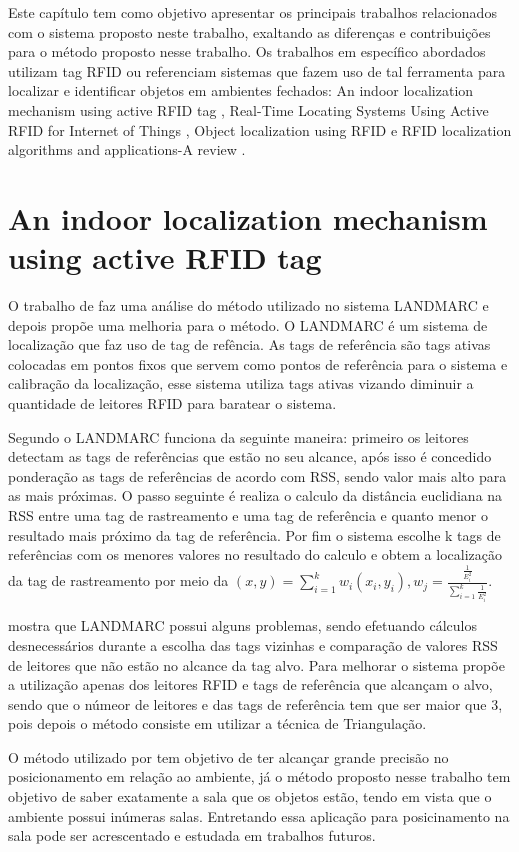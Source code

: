 \label{chapter:correlatos}
Este capítulo tem como objetivo apresentar os principais trabalhos relacionados com o sistema proposto neste trabalho, exaltando as diferenças e contribuições para o método proposto nesse trabalho. Os trabalhos em específico abordados utilizam tag RFID ou referenciam sistemas que fazem uso de tal ferramenta para localizar e identificar objetos em ambientes fechados: An indoor localization mechanism using active RFID tag \cite{mechanismRFID2006}, Real-Time Locating Systems Using Active RFID for Internet of Things \cite{realtimeRFID2016}, Object localization using RFID \cite{localization2010} e RFID localization algorithms and applications-A review \cite{rfid2009review}.

\section{An indoor localization mechanism using active RFID tag}
O trabalho de \citeauthor{mechanismRFID2006} faz uma análise do método utilizado no sistema LANDMARC e depois propõe uma melhoria para o método. O LANDMARC é um sistema de localização que faz uso de tag de refência. As tags de referência são tags ativas colocadas em pontos fixos que servem como pontos de referência para o sistema e calibração da localização, esse sistema utiliza tags ativas vizando diminuir a quantidade de leitores RFID para baratear o sistema.

\par
Segundo \citeauthor{mechanismRFID2006} o LANDMARC funciona da seguinte maneira: primeiro os leitores detectam as tags de referências que estão no seu alcance, após isso é concedido ponderação as tags de referências de acordo com RSS, sendo valor mais alto para as mais próximas. O passo seguinte é realiza o calculo da distância euclidiana na RSS entre uma tag de rastreamento e uma tag de referência e quanto menor o resultado mais próximo da tag de referência. Por fim o sistema escolhe k tags de referências com os menores valores no resultado do calculo e obtem a localização da tag de rastreamento por meio da $(x,y) = \sum^k_{i=1}w_i(x_i,y_i), w_j=\frac{\frac{1}{E_i^2}}{\sum_{i=1}^k\frac{1}{E^2_i}}$. 
\par
\citeauthor{mechanismRFID2006} mostra que LANDMARC possui alguns problemas, sendo efetuando cálculos desnecessários durante a escolha das tags vizinhas e comparação de valores RSS de leitores que não estão no alcance da tag alvo. Para melhorar o sistema \citeauthor{mechanismRFID2006} propõe a utilização apenas dos leitores RFID  e tags de referência que alcançam o alvo, sendo que o númeor de leitores e das tags de referência tem que ser maior que 3, pois depois o método consiste em utilizar a técnica de Triangulação.
\par
O método utilizado por \citeauthor{mechanismRFID2006} tem objetivo de ter alcançar grande precisão no posicionamento em relação ao ambiente, já o método proposto nesse trabalho tem objetivo de saber exatamente a sala que os objetos estão, tendo em vista que o ambiente possui inúmeras salas. Entretando essa aplicação para posicinamento na sala pode ser acrescentado e estudada em trabalhos futuros.

